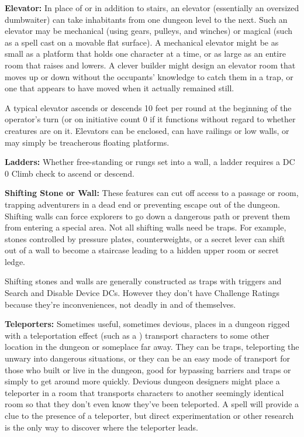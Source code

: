 \textbf{Elevator:} In place of or in addition to stairs, an elevator (essentially an oversized dumbwaiter) can take inhabitants from one dungeon level to the next. Such an elevator may be mechanical (using gears, pulleys, and winches) or magical (such as a  spell cast on a movable flat surface). A mechanical elevator might be as small as a platform that holds one character at a time, or as large as an entire room that raises and lowers. A clever builder might design an elevator room that moves up or down without the occupants' knowledge to catch them in a trap, or one that appears to have moved when it actually remained still. 

A typical elevator ascends or descends 10 feet per round at the beginning of the operator's turn (or on initiative count 0 if it functions without regard to whether creatures are on it. Elevators can be enclosed, can have railings or low walls, or may simply be treacherous floating platforms.

\textbf{Ladders:} Whether free-standing or rungs set into a wall, a ladder requires a DC 0 Climb check to ascend or descend.

\textbf{Shifting Stone or Wall:} These features can cut off access to a passage or room, trapping adventurers in a dead end or preventing escape out of the dungeon. Shifting walls can force explorers to go down a dangerous path or prevent them from entering a special area. Not all shifting walls need be traps. For example, stones controlled by pressure plates, counterweights, or a secret lever can shift out of a wall to become a staircase leading to a hidden upper room or secret ledge.

Shifting stones and walls are generally constructed as traps with triggers and Search and Disable Device DCs. However they don't have Challenge Ratings because they're inconveniences, not deadly in and of themselves.

\textbf{Teleporters:} Sometimes useful, sometimes devious, places in a dungeon rigged with a teleportation effect (such as a ) transport characters to some other location in the dungeon or someplace far away. They can be traps, teleporting the unwary into dangerous situations, or they can be an easy mode of transport for those who built or live in the dungeon, good for bypassing barriers and traps or simply to get around more quickly. Devious dungeon designers might place a teleporter in a room that transports characters to another seemingly identical room so that they don't even know they've been teleported. A spell will provide a clue to the presence of a teleporter, but direct experimentation or other research is the only way to discover where the teleporter leads.

